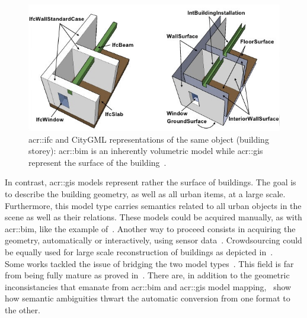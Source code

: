             \begin{figure}[htpb]
                \centering
                \includegraphics[width=\textwidth]{images/introduction/bim_vs_gis}            
                \caption{
                    \label{fig::bim_vs_gis} \gls{acr::ifc} and CityGML representations of the same object (building storey): \gls{acr::bim} is an inherently volumetric model while \gls{acr::gis} represent the surface of the building~\parencite{nagel2009conceptual}.
                }
            \end{figure}

            In contrast, \gls{acr::gis} models represent rather the surface of buildings.
            The goal is to describe the building geometry, as well as all urban items, at a large scale.
            Furthermore, this model type carries semantics related to all urban objects in the scene as well as their relations.
            These models could be acquired manually, as with \gls{acr::bim}, like the example of~\textcite{ref3dnat}.
            Another way to proceed consists in acquiring the geometry, automatically or interactively, using sensor data~\parencite{musialski2013survey}.
            Crowdsourcing could be equally used for large scale reconstruction of buildings as depicted in~\textcite{uden2013open}.\\

            Some works tackled the issue of bridging the two model types~\parencite{deng2016mapping}.
            This field is far from being fully mature as proved in~\textcite{stoter2018geo}.
            There are, in addition to the geometric inconsistancies that emanate from \gls{acr::bim} and \gls{acr::gis} model mapping,~\textcite{stoter2018geo} show how semantic ambiguities thwart the automatic conversion from one format to the other.\\


